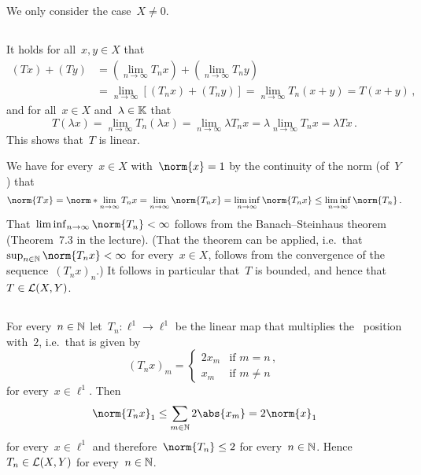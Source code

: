 \section{}

We only consider the case~$X \neq 0$.





\subsection{}

It holds for all~$x, y \in X$ that
\begin{align*}
      (T x) + (T y)
  &=  \left( \lim_{n \to \infty} T_n x \right) + \left( \lim_{n \to \infty} T_n y \right) \\
  &=  \lim_{n \to \infty} [ (T_n x) + (T_n y) ]
   = \lim_{n \to \infty} T_n(x + y)
   = T (x + y)  \,,
\end{align*}
and for all~$x \in X$ and~$\lambda \in \mathbb{K}$ that
\[
    T(\lambda x)
  = \lim_{n \to \infty} T_n(\lambda x)
  = \lim_{n \to \infty} \lambda T_n x
  = \lambda \lim_{n \to \infty} T_n x
  = \lambda T x \,.
\]
This shows that~$T$ is linear.

We have for every~$x \in X$ with~$\norm{x} = 1$ by the continuity of the norm (of~$Y$) that
\[
        \norm{T x}
  =     \norm*{\lim_{n \to \infty} T_n x}
  =     \lim_{n \to \infty} \norm{T_n x}
  =     \liminf_{n \to \infty} \norm{T_n x}
  \leq  \liminf_{n \to \infty} \norm{T_n} \,.
\]
That~$\liminf_{n \to \infty} \norm{T_n} < \infty$ follows from the Banach--Steinhaus theorem (Theorem~7.3 in the lecture).
(That the theorem can be applied, i.e.\ that~$\sup_{n \in \Natural} \norm{T_n x} < \infty$ for every~$x \in X$, follows from the convergence of the sequence~$(T_n x)_n$.)
It follows in particular that~$T$ is bounded, and hence that~$T \in \mathcal{L}(X,Y)$.





\subsection{}

For every~$n \in \mathbb{N}$ let~$T_n \colon \ell^1 \to \ell^1$ be the linear map that multiplies the~ position with~$2$, i.e.\ that is given by
\[
    (T_n x)_m
  = \begin{cases}
      2 x_m & \text{if~$m = n$}     \,, \\
        x_m & \text{if~$m \neq n$}
    \end{cases}
\]
for every~$x \in \ell^1$.
Then
\[
        \norm{T_n x}_1
  \leq  \sum_{m \in \Natural} 2 \abs{x_m}
  =     2 \norm{x}_1
\]
for every~$x \in \ell^1$ and therefore~$\norm{T_n} \leq 2$ for every~$n \in \mathbb{N}$.
Hence~$T_n \in \mathcal{L}(X,Y)$ for every~$n \in \mathbb{N}$.

